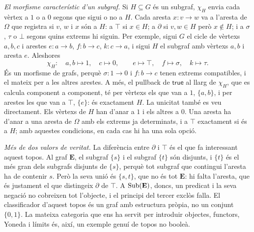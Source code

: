 \begin{exemple}
\emph{El morfisme característic d'un subgraf.} Si $H\subseteq G$ és un subgraf, $\chi_H$ envia cada vèrtex a $1$ o a $0$ segons que sigui o no a $H$. Cada aresta $x\colon v\to w$ va a l'aresta de $\Omega$ que registra si $v$, $w$ i $x$ són a $H$: a $\top$ si $x\in H$; a $\partial$ si $v,w\in H$ però $x\notin H$; i a $\sigma$, $\tau$ o $\bot$ segons quins extrems hi siguin. Per exemple, sigui $G$ el cicle de vèrtexs $a,b,c$ i arestes $e\colon a\to b$, $f\colon b\to c$, $k\colon c\to a$, i sigui $H$ el subgraf amb vèrtexs $a,b$ i aresta $e$. Aleshores
\[
\chi_H\colon\quad a,b\mapsto1,\quad c\mapsto0,\qquad e\mapsto\top,\quad f\mapsto\sigma,\quad k\mapsto\tau.
\]
És un morfisme de grafs, perquè $\sigma\colon1\to0$ i $f\colon b\to c$ tenen extrems compatibles, i el mateix per a les altres arestes. A més, el pullback de $\mathsf{true}$ al llarg de $\chi_H$, que es calcula component a component, té per vèrtexs els que van a $1$, $\{a,b\}$, i per arestes les que van a $\top$, $\{e\}$: és exactament $H$. La unicitat també es veu directament. Els vèrtexs de $H$ han d'anar a $1$ i els altres a $0$. Una aresta ha d'anar a una aresta de $\Omega$ amb els extrems ja determinats, i a $\top$ exactament si és a $H$; amb aquestes condicions, en cada cas hi ha una sola opció.

\emph{Més de dos valors de veritat.} La diferència entre $\partial$ i $\top$ és el que fa interessant aquest topos. Al graf $\mathbf E$, el subgraf $\{s\}$ i el subgraf $\{t\}$ són disjunts, i $\{t\}$ és el més gran dels subgrafs disjunts de $\{s\}$, perquè tot subgraf que contingui l'aresta ha de contenir $s$. Però la seva unió és $\{s,t\}$, que no és tot $\mathbf E$: hi falta l'aresta, que és justament el que distingeix $\partial$ de $\top$. A $\operatorname{Sub}(\mathbf E)$, doncs, un predicat i la seva negació no cobreixen tot l'objecte, i el principi del tercer exclòs falla. El classificador d'aquest topos és un graf amb estructura pròpia, no un conjunt $\{0,1\}$. La mateixa categoria que ens ha servit per introduir objectes, functors, Yoneda i límits és, així, un exemple genuí de topos no booleà.
\end{exemple}

